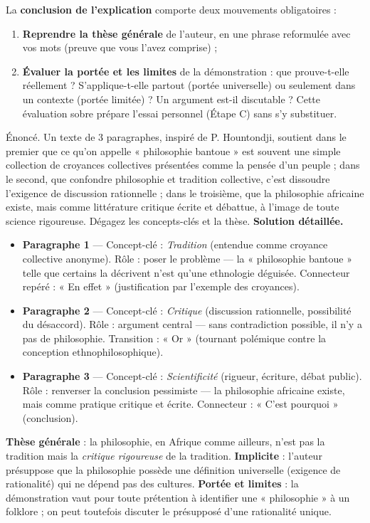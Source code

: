 \documentclass[11pt]{article}
\begin{document}
La \textbf{conclusion de l'explication} comporte deux mouvements obligatoires :
\begin{enumerate}
\item \textbf{Reprendre la thèse générale} de l'auteur, en une phrase reformulée avec vos mots (preuve que vous l'avez comprise) ;
\item \textbf{Évaluer la portée et les limites} de la démonstration : que prouve-t-elle réellement ? S'applique-t-elle partout (portée universelle) ou seulement dans un contexte (portée limitée) ? Un argument est-il discutable ? Cette évaluation sobre prépare l'essai personnel (Étape C) sans s'y substituer.
\end{enumerate}

\begin{exoresolu}
Énoncé. Un texte de 3 paragraphes, inspiré de P. Hountondji, soutient dans le premier que ce qu'on appelle « philosophie bantoue » est souvent une simple collection de croyances collectives présentées comme la pensée d'un peuple ; dans le second, que confondre philosophie et tradition collective, c'est dissoudre l'exigence de discussion rationnelle ; dans le troisième, que la philosophie africaine existe, mais comme littérature critique écrite et débattue, à l'image de toute science rigoureuse. Dégagez les concepts-clés et la thèse.
\tcblower
\textbf{Solution détaillée.}
\begin{itemize}
\item \textbf{Paragraphe 1} — Concept-clé : \emph{Tradition} (entendue comme croyance collective anonyme). Rôle : poser le problème — la « philosophie bantoue » telle que certains la décrivent n'est qu'une ethnologie déguisée. Connecteur repéré : « En effet » (justification par l'exemple des croyances).
\item \textbf{Paragraphe 2} — Concept-clé : \emph{Critique} (discussion rationnelle, possibilité du désaccord). Rôle : argument central — sans contradiction possible, il n'y a pas de philosophie. Transition : « Or » (tournant polémique contre la conception ethnophilosophique).
\item \textbf{Paragraphe 3} — Concept-clé : \emph{Scientificité} (rigueur, écriture, débat public). Rôle : renverser la conclusion pessimiste — la philosophie africaine existe, mais comme pratique critique et écrite. Connecteur : « C'est pourquoi » (conclusion).
\end{itemize}
\textbf{Thèse générale} : la philosophie, en Afrique comme ailleurs, n'est pas la tradition mais la \emph{critique rigoureuse} de la tradition. \textbf{Implicite} : l'auteur présuppose que la philosophie possède une définition universelle (exigence de rationalité) qui ne dépend pas des cultures. \textbf{Portée et limites} : la démonstration vaut pour toute prétention à identifier une « philosophie » à un folklore ; on peut toutefois discuter le présupposé d'une rationalité unique.
\end{exoresolu}
\end{document}
